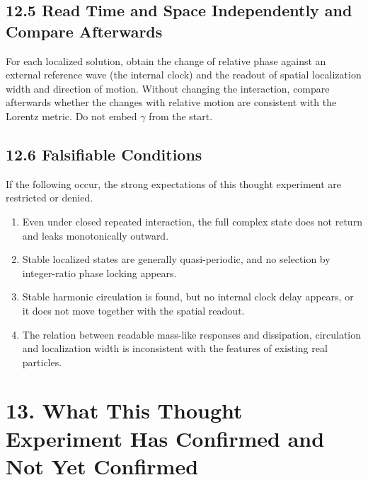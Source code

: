 \documentclass[
  a4paper,
]{article}
\providecommand{\tightlist}{%
  \setlength{\itemsep}{0pt}\setlength{\parskip}{0pt}}
\begin{document}
\subsection{12.5 Read Time and Space Independently and Compare
Afterwards}\label{read-time-and-space-independently-and-compare-afterwards}

For each localized solution, obtain the change of relative phase against
an external reference wave (the internal clock) and the readout of
spatial localization width and direction of motion. Without changing the
interaction, compare afterwards whether the changes with relative motion
are consistent with the Lorentz metric. Do not embed \(\gamma\) from the
start.

\subsection{12.6 Falsifiable Conditions}\label{falsifiable-conditions}

If the following occur, the strong expectations of this thought
experiment are restricted or denied.

\begin{enumerate}
\def\labelenumi{\arabic{enumi}.}
\tightlist
\item
  Even under closed repeated interaction, the full complex state does
  not return and leaks monotonically outward.
\item
  Stable localized states are generally quasi-periodic, and no selection
  by integer-ratio phase locking appears.
\item
  Stable harmonic circulation is found, but no internal clock delay
  appears, or it does not move together with the spatial readout.
\item
  The relation between readable mass-like responses and dissipation,
  circulation and localization width is inconsistent with the features
  of existing real particles.
\end{enumerate}

\section{13. What This Thought Experiment Has Confirmed and Not Yet
Confirmed}\label{what-this-thought-experiment-has-confirmed-and-not-yet-confirmed}
\end{document}
